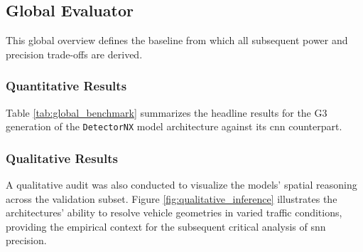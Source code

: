 \subsection{Global Evaluator}

This global overview defines the baseline from which all subsequent power and precision trade-offs are derived.

\subsubsection*{Quantitative Results}
Table \ref{tab:global_benchmark} summarizes the headline results for the G3 generation of the \texttt{DetectorNX} model architecture against its \gls{cnn} counterpart.

\begin{table}[H]
\centering
{}
\caption{Global Performance Benchmark results for \texttt{DetectorNX-G3-SNN} and \texttt{DetectorNX-G3-CNN}, evaluated across the full 200-sample ETraM validation set \parencite{Verma_2024_CVPR}. Ground truth average detections per frame is 2.02 for both models by definition.}
\label{tab:global_benchmark}
\end{table}

\subsubsection*{Qualitative Results}

A qualitative audit was also conducted to visualize the models' spatial reasoning across the validation subset. Figure \ref{fig:qualitative_inference} illustrates the architectures' ability to resolve vehicle geometries in varied traffic conditions, providing the empirical context for the subsequent critical analysis of \gls{snn} precision.

